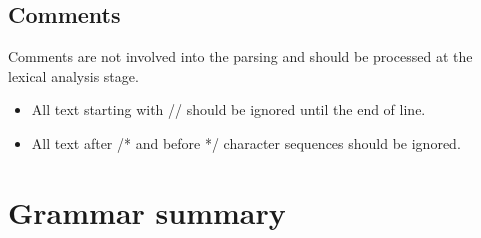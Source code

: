 \documentclass{article}
\begin{document}
        \subsection{Comments}
            Comments are not involved into the parsing and should be processed at the
            lexical analysis stage.

            \begin{itemize}
                \item All text starting with // should be ignored until the end of line.

                \item All text after /*  and before */ character sequences should be
                      ignored.
            \end{itemize}

    \section{Grammar summary}
        \itshape
        \setlength{\grammarindent}{12em}
\end{document}
